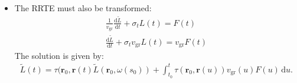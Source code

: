 \documentclass[10pt]{article}
\newcommand{\dee}{\mathrm{d}}
\newcommand{\ve}[1]{\mathbf{#1}}
\newcommand{\group}{\mathrm{gr}}
\begin{document}
\begin{itemize}
    \item The RRTE must also be transformed:
    \begin{align*}
      \frac{1}{v_\group} \frac{\dee \tilde L}{\dee t} + \sigma_t L(t) = F(t) \\
      \frac{\dee \tilde L}{\dee t} + \sigma_t v_\group L(t) = v_\group F(t)
    \end{align*}
    The solution is given by:
    \begin{align*}
      \tilde L(t) 
      = \tau(\ve{r}_0, \ve{r}(t) \tilde L(\ve{r}_0, \omega(s_0))
      + \int_{t_0}^t \tau(\ve{r}_0, \ve{r}(u)) v_\group(u) F(u)\, \dee u.
    \end{align*}
  \end{itemize}

  
     
\end{document}
